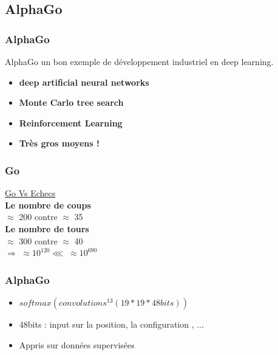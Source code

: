 \subsection{AlphaGo}



\begin{frame}
  \frametitle{AlphaGo}
  AlphaGo un bon exemple de développement industriel en deep learning.
  \begin{itemize}
  \item \textbf{deep artificial neural networks}
  \item \textbf{Monte Carlo tree search}
  \item \textbf{Reinforcement Learning}
  \item \textbf{Très gros moyens !}    
  \end{itemize}
\end{frame}

\begin{frame}
  \frametitle{Go}
  \begin{minipage}[c]{0.6\linewidth}
  \end{minipage}\hfill
  \begin{minipage}[c]{0.33\linewidth}
    \begin{center}
      \underline{Go Vs Echecs} \\
      \textbf{Le nombre de coups} \\
      $\approx$ 200 contre $\approx$ 35 \\
      \textbf{Le nombre de tours} \\
      $\approx$ 300 contre $\approx$ 40 \\
      $\Rightarrow$ $\approx 10^{120}\lll \;\approx 10^{690}$
    \end{center}
  \end{minipage}\hfill
\end{frame}

\begin{frame}
  \frametitle{AlphaGo}
  \begin{minipage}[c]{0.50\linewidth}
    \begin{itemize}
    \item $softmax(convolutions^{13}(19*19*48{bits}))$
    \item 48bits : input sur la position, la configuration , ...
    \item Appris sur données supervisées
    \end{itemize}
  \end{minipage}\hfill
  \begin{minipage}[c]{0.49\linewidth}
  \end{minipage}\hfill
\end{frame}

